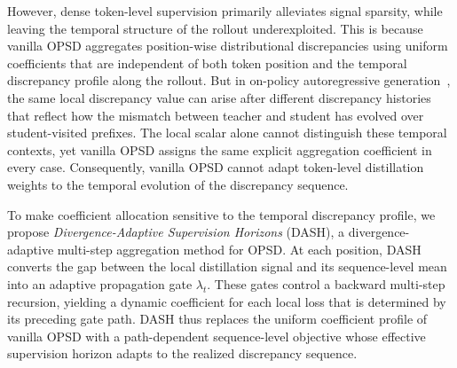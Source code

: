\documentclass[letterpaper]{article} %
\begin{document}

However, dense token-level supervision primarily alleviates signal sparsity, while leaving the temporal structure of the rollout underexploited. This is because vanilla OPSD aggregates position-wise distributional discrepancies using uniform coefficients that are independent of both token position and the temporal discrepancy profile along the rollout. But in on-policy autoregressive generation~\cite{ross2011dagger,bengio2015scheduled}, the same local discrepancy value can arise after different discrepancy histories that reflect how the mismatch between teacher and student has evolved over student-visited prefixes. The local scalar alone cannot distinguish these temporal contexts, yet vanilla OPSD assigns the same explicit aggregation coefficient in every case. Consequently, vanilla OPSD cannot adapt token-level distillation weights to the temporal evolution of the discrepancy sequence.


To make coefficient allocation sensitive to the temporal discrepancy profile, we propose \emph{Divergence-Adaptive Supervision Horizons} (DASH), a divergence-adaptive multi-step aggregation method for OPSD. At each position, DASH converts the gap between the local distillation signal and its sequence-level mean into an adaptive propagation gate $\lambda_t$. These gates control a backward multi-step recursion, yielding a dynamic coefficient for each local loss that is determined by its preceding gate path. DASH thus replaces the uniform coefficient profile of vanilla OPSD with a path-dependent sequence-level objective whose effective supervision horizon adapts to the realized discrepancy sequence.
\end{document}
